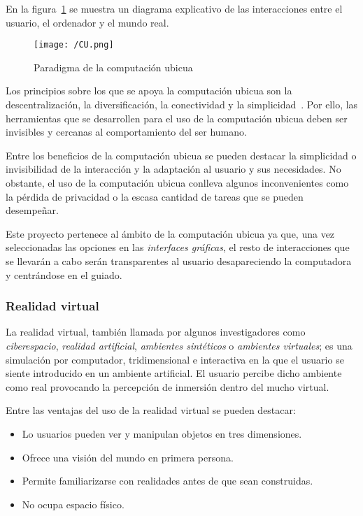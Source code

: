 En la figura~\ref{fig:cu} se muestra un diagrama explicativo de las interacciones entre el usuario,
el ordenador y el mundo real.

\begin{figure}[!h]
  \begin{center}
    \texttt{[image: /CU.png]}
    \caption{Paradigma de la computación ubicua}
    \label{fig:cu}
  \end{center}
\end{figure}

Los principios sobre los que se apoya la computación ubicua son la descentralización, la
diversificación, la conectividad y la simplicidad~\cite{Lothar13}. Por ello, las herramientas que se
desarrollen para el uso de la computación ubicua deben ser invisibles y cercanas al comportamiento
del ser humano.

Entre los beneficios de la computación ubicua se pueden destacar la simplicidad o invisibilidad de
la interacción y la adaptación al usuario y sus necesidades. No obstante, el uso de la computación
ubicua conlleva algunos inconvenientes como la pérdida de privacidad o la escasa cantidad de tareas
que se pueden desempeñar.

Este proyecto pertenece al ámbito de la computación ubicua ya que, una vez seleccionadas las
opciones en las \emph{interfaces gráficas}, el resto de interacciones que se llevarán a cabo serán
transparentes al usuario desapareciendo la computadora y centrándose en el guiado.

\subsubsection{Realidad virtual}

La realidad virtual, también llamada por algunos investigadores como \emph{ciberespacio},
\emph{realidad artificial}, \emph{ambientes sintéticos} o \emph{ambientes virtuales}; es una
simulación por computador, tridimensional e interactiva en la que el usuario se siente introducido
en un ambiente artificial. El usuario percibe dicho ambiente como real provocando la percepción de
inmersión dentro del mucho virtual.

Entre las ventajas del uso de la realidad virtual se pueden destacar:

\begin{itemize}
  \item Lo usuarios pueden ver y manipulan objetos en tres dimensiones.
  \item Ofrece una visión del mundo en primera persona.
  \item Permite familiarizarse con realidades antes de que sean construidas.
  \item No ocupa espacio físico.
\end{itemize}

